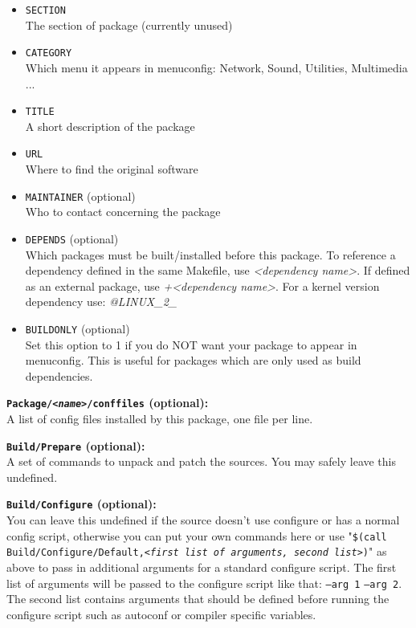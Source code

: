    \begin{itemize}
        \item \texttt{SECTION} \\
            The section of package (currently unused)
        \item \texttt{CATEGORY} \\
            Which menu it appears in menuconfig: Network, Sound, Utilities, Multimedia ...
        \item \texttt{TITLE} \\
            A short description of the package
        \item \texttt{URL} \\
            Where to find the original software
        \item \texttt{MAINTAINER} (optional) \\
            Who to contact concerning the package
        \item \texttt{DEPENDS} (optional) \\
            Which packages must be built/installed before this package. To reference a dependency defined in the
			same Makefile, use \textit{<dependency name>}. If defined as an external package, use 
			\textit{+<dependency name>}. For a kernel version dependency use: \textit{@LINUX\_2\_<minor version>}
		\item \texttt{BUILDONLY} (optional) \\
			Set this option to 1 if you do NOT want your package to appear in menuconfig.
			This is useful for packages which are only used as build dependencies.
    \end{itemize}

\textbf{\texttt{Package/\textit{<name>}/conffiles} (optional):} \\
   A list of config files installed by this package, one file per line.

\textbf{\texttt{Build/Prepare} (optional):} \\
   A set of commands to unpack and patch the sources. You may safely leave this
   undefined.

\textbf{\texttt{Build/Configure} (optional):} \\
   You can leave this undefined if the source doesn't use configure or has a
   normal config script, otherwise you can put your own commands here or use
   "\texttt{\$(call Build/Configure/Default,\textit{<first list of arguments, second list>})}" as above to
   pass in additional arguments for a standard configure script. The first list of arguments will be passed
   to the configure script like that: \texttt{--arg 1} \texttt{--arg 2}. The second list contains arguments that should be
   defined before running the configure script such as autoconf or compiler specific variables.
   
